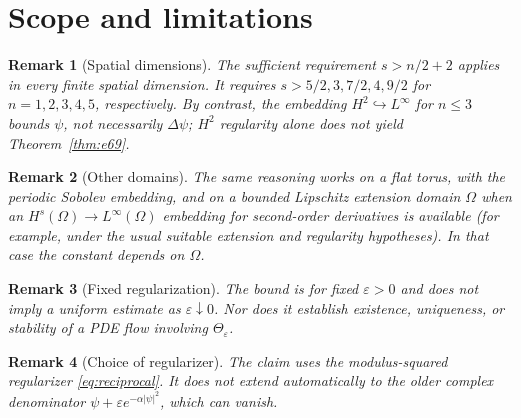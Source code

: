 \documentclass[11pt]{article}
\newtheorem{remark}{Remark}
\newcommand{\eps}{\varepsilon}
\begin{document}
\section{Scope and limitations}

\begin{remark}[Spatial dimensions]
The sufficient requirement $s>n/2+2$ applies in every finite spatial
dimension. It requires $s>5/2,3,7/2,4,9/2$ for $n=1,2,3,4,5$,
respectively. By contrast, the embedding $H^2\hookrightarrow L^\infty$
for $n\le3$ bounds $\psi$, not necessarily $\Delta\psi$;
$H^2$ regularity alone does not yield Theorem~\ref{thm:e69}.
\end{remark}

\begin{remark}[Other domains]
The same reasoning works on a flat torus, with the periodic Sobolev
embedding, and on a bounded Lipschitz extension domain $\Omega$
when an $H^s(\Omega)\to L^\infty(\Omega)$ embedding for second-order
derivatives is available (for example, under the usual suitable extension
and regularity hypotheses). In that case the constant depends on $\Omega$.
\end{remark}

\begin{remark}[Fixed regularization]
The bound is for fixed $\eps>0$ and does not imply a uniform estimate
as $\eps\downarrow0$. Nor does it establish existence, uniqueness, or
stability of a PDE flow involving $\Theta_\eps$.
\end{remark}

\begin{remark}[Choice of regularizer]
The claim uses the modulus-squared regularizer \eqref{eq:reciprocal}.
It does not extend automatically to the older complex denominator
$\psi+\eps e^{-\alpha|\psi|^2}$, which can vanish.
\end{remark}
\end{document}
